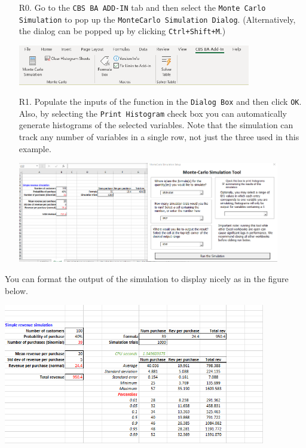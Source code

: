 \documentclass[12pt]{article}
\begin{document}
\begin{itemize}
\item[R0.] Go to the \texttt{CBS BA ADD-IN} tab and then select the \texttt{Monte Carlo Simulation} to pop up the \texttt{MonteCarlo Simulation Dialog}. (Alternatively, the  dialog can be popped up by clicking \texttt{Ctrl+Shift+M}.)

\medskip

\centerline{\includegraphics[width=4in]{figures/simul0.png}}

\item[R1.] Populate the inputs of the function in the \texttt{Dialog Box} and then click \texttt{OK}. Also, by selecting the \texttt{Print Histogram} check box you can automatically generate histograms of the selected variables. Note that the simulation can track any number of variables in a single row, not just the three used in this example.

\centerline{\includegraphics[width=4.5in]{figures/simul6.png}}
\end{itemize}

You can format the output of the simulation to display nicely as in the figure below.

\medskip

\centerline{\includegraphics[width=4.5in]{figures/simul7.png}}
\end{document}
